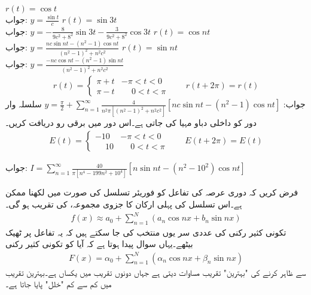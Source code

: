 \quad
$r(t)=\cos t$\\
جواب:\quad
$y=\tfrac{\sin t}{c}$
\quad
$r(t)=\sin 3t$\\
جواب:\quad
$y=-\tfrac{8}{9c^2+8^2}\sin 3t-\tfrac{3}{9c^2+8^2}\cos 3t$
\quad
$r(t)=\cos nt$\\
جواب:\quad
$y=\tfrac{nc\sin nt-(n^2-1)\cos nt}{(n^2-1)^2+n^2c^2}$
\quad
$r(t)=\sin nt$\\
جواب:\quad
$y=\tfrac{-nc\cos nt-(n^2-1)\sin nt}{(n^2-1)^2+n^2c^2}$
\begin{align*}
r(t)=
\begin{cases}
\pi+t&-\pi<t<0\\
\pi-t&\phantom{-}0<t<\pi
\end{cases}
\quad \quad r(t+2\pi)=r(t)
\end{align*}
جواب:\quad
$y=\tfrac{\pi}{2}+\sum\limits_{n=1}^{\infty}\tfrac{4}{n^2\pi[(n^2-1)^2+n^2c^2]}[nc\sin nt-(n^2-1)\cos nt]$
\quad سلسلہ وار  دور کو   داخلی دباو مہیا کی جاتی ہے۔اس دور میں برقی رو  دریافت کریں۔
\begin{align*}
E(t)=
\begin{cases}
-10&-\pi<t<0\\
\phantom{-}10&\phantom{-}0<t< \pi
\end{cases}
\quad \quad E(t+2\pi)=E(t)
\end{align*}
%
\begin{figure}
\centering
{}
\end{figure}
جواب:\quad
$I=\sum\limits_{n=1}^{\infty}\tfrac{40}{\pi[n^4-199n^2+10^4]}[n\sin nt-(n^2-10^2)\cos nt]$

فرض کریں کہ  دوری عرصہ کی تفاعل  کو فوریئر تسلسل کی صورت میں لکھنا ممکن ہے۔اس تسلسل کی پہلی  ارکان کا جزوی مجموعہ،  کی تقریب ہو گی۔
\begin{align}\label{مساوات_فوریئر_تقریب_الف}
f(x)\approx a_0+\sum\limits_{n=1}^{N}(a_n\cos nx+b_n\sin nx)
\end{align}
تکونی کثیر رکنی کی عددی سر یوں منتخب کی جا سکتے ہیں  کہ یہ تفاعل پر ٹھیک بیٹھے۔یہاں سوال پیدا ہوتا ہے کہ آیا  کو تکونی کثیر رکنی
\begin{align}\label{مساوات_فوریئر_تقریب_ب}
F(x)=\alpha_0+\sum\limits_{n=1}^{N} (\alpha_n \cos nx+\beta_n\sin nx)
\end{align}
سے ظاہر کرنے کی "بہترین" تقریب مساوات  دیتی ہے جہاں دونوں تقریب میں  یکساں ہے۔بہترین تقریب  میں کم سے کم "خلل" پایا جاتا ہے۔

